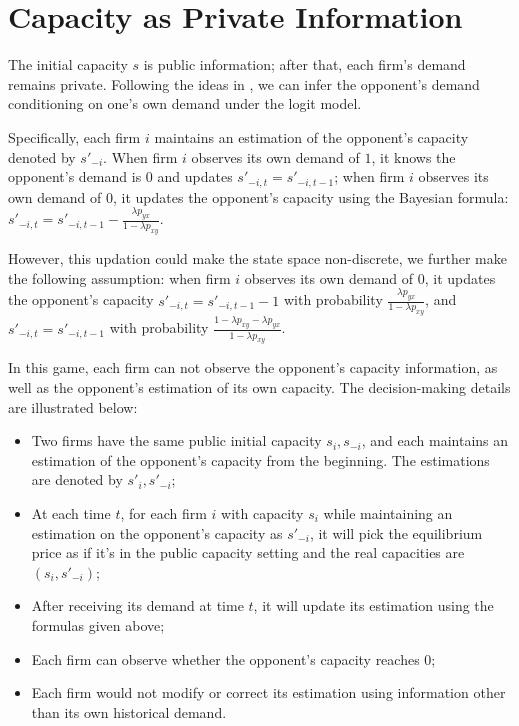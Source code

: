 \documentclass[12pt,letterpaper]{article}
\begin{document}
\section{Capacity as Private Information}

The initial capacity $s$ is public information; after that, each firm's demand remains private. Following the ideas in \cite{loots2023data}, we can infer the opponent's demand conditioning on one's own demand under the logit model. 

Specifically, each firm $i$ maintains an estimation of the opponent's capacity denoted by $s'_{-i}$. When firm $i$ observes its own demand of $1$, it knows the opponent's demand is $0$ and updates $s'_{-i,t}=s'_{-i,t-1}$; when firm $i$ observes its own demand of $0$, it updates the opponent's capacity using the Bayesian formula: $s'_{-i,t} = s'_{-i,t-1}-\frac{\lambda p_{yx}}{1-\lambda p_{xy}}$. 

However, this updation could make the state space non-discrete, we further make the following assumption: when firm $i$ observes its own demand of $0$, it updates the opponent's capacity $s'_{-i,t} = s'_{-i,t-1}-1$ with probability $\frac{\lambda p_{yx}}{1-\lambda p_{xy}}$, and $s'_{-i,t} = s'_{-i,t-1}$ with probability $\frac{1-\lambda p_{xy}-\lambda p_{yx}}{1-\lambda p_{xy}}$.

In this game, each firm can not observe the opponent's capacity information, as well as the opponent's estimation of its own capacity. The decision-making details are illustrated below:

\begin{itemize}
    \item Two firms have the same public initial capacity $s_i, s_{-i}$, and each maintains an estimation of the opponent’s capacity from the beginning. The estimations are denoted by $s'_i,s'_{-i}$;
    \item At each time $t$, for each firm $i$ with capacity $s_i$ while maintaining an estimation on the opponent's capacity as $s'_{-i}$, it will pick the equilibrium price as if it's in the public capacity setting and the real capacities are $(s_i,s'_{-i})$;
    \item After receiving its demand at time $t$, it will update its estimation using the formulas given above;
    \item Each firm can observe whether the opponent's capacity reaches $0$;
    \item Each firm would not modify or correct its estimation using information other than its own historical demand.
\end{itemize}
\end{document}
